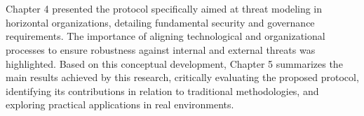 \section*{}
Chapter 4 presented the protocol specifically aimed at
threat modeling in horizontal organizations, detailing fundamental security and
governance requirements. The importance of aligning technological and
organizational processes to ensure robustness against internal and
external threats was highlighted. Based on this conceptual
development, Chapter 5 summarizes the main results achieved by this research,
critically evaluating the proposed protocol, identifying its contributions in
relation to traditional methodologies, and exploring practical applications in real environments.
